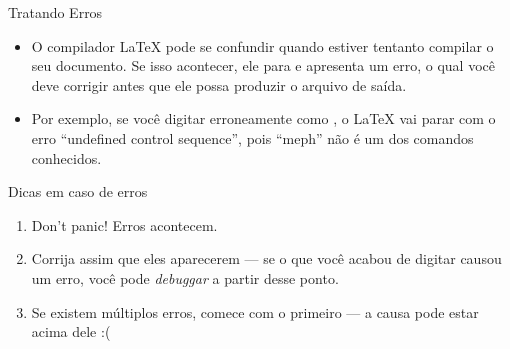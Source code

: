 \documentclass{beamer}
\begin{document}
\begin{frame}[fragile]{Tratando Erros}
	\begin{itemize}
		\item O compilador \LaTeX{} pode se confundir quando estiver tentanto 
		compilar o seu documento. Se isso acontecer, ele para e apresenta um erro, 
		o qual você deve corrigir antes que ele possa produzir o arquivo de saída.
		
		\item Por exemplo, se voc\^e digitar erroneamente  como ,
		o \LaTeX{} vai parar com o erro ``undefined control sequence'', pois ``meph'' não 
		é um dos comandos conhecidos.
	\end{itemize}
	
	\begin{block}{Dicas em caso de erros}
		\begin{enumerate}
			\item \alert{Don't panic}! Erros acontecem.
			\item Corrija assim que eles aparecerem --- se o que voc\^e acabou de digitar causou um erro, voc\^e pode \textit{debuggar} a partir desse ponto.
			\item Se existem m\'ultiplos erros, comece com o primeiro --- a causa pode estar acima dele :(
		\end{enumerate}
	\end{block}
\end{frame}
\end{document}
